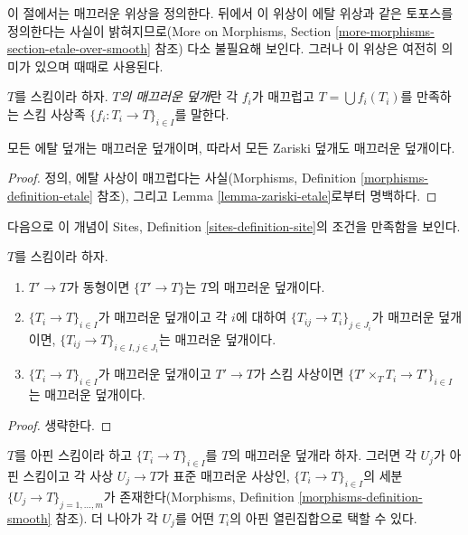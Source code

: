 \noindent
이 절에서는 매끄러운 위상을 정의한다. 뒤에서 이 위상이 에탈 위상과
같은 토포스를 정의한다는 사실이 밝혀지므로(More on Morphisms, Section
\ref{more-morphisms-section-etale-over-smooth} 참조) 다소 불필요해
보인다. 그러나 이 위상은 여전히 의미가 있으며 때때로 사용된다.

\begin{definition}
\label{definition-smooth-covering}
$T$를 스킴이라 하자. {\it $T$의 매끄러운 덮개}란 각 $f_i$가 매끄럽고
$T = \bigcup f_i(T_i)$를 만족하는 스킴 사상족
$\{f_i : T_i \to T\}_{i \in I}$를 말한다.
\end{definition}

\begin{lemma}
\label{lemma-zariski-etale-smooth}
모든 에탈 덮개는 매끄러운 덮개이며, 따라서 모든 Zariski 덮개도
매끄러운 덮개이다.
\end{lemma}

\begin{proof}
정의, 에탈 사상이 매끄럽다는 사실(Morphisms, Definition
\ref{morphisms-definition-etale} 참조), 그리고 Lemma
\ref{lemma-zariski-etale}로부터 명백하다.
\end{proof}

\noindent
다음으로 이 개념이 Sites, Definition \ref{sites-definition-site}의
조건을 만족함을 보인다.

\begin{lemma}
\label{lemma-smooth}
$T$를 스킴이라 하자.
\begin{enumerate}
\item $T' \to T$가 동형이면 $\{T' \to T\}$는 $T$의 매끄러운 덮개이다.
\item $\{T_i \to T\}_{i\in I}$가 매끄러운 덮개이고 각 $i$에 대하여
$\{T_{ij} \to T_i\}_{j\in J_i}$가 매끄러운 덮개이면,
$\{T_{ij} \to T\}_{i \in I, j\in J_i}$는 매끄러운 덮개이다.
\item $\{T_i \to T\}_{i\in I}$가 매끄러운 덮개이고 $T' \to T$가
스킴 사상이면 $\{T' \times_T T_i \to T'\}_{i\in I}$는 매끄러운
덮개이다.
\end{enumerate}
\end{lemma}

\begin{proof}
생략한다.
\end{proof}

\begin{lemma}
\label{lemma-smooth-affine}
$T$를 아핀 스킴이라 하고 $\{T_i \to T\}_{i \in I}$를 $T$의 매끄러운
덮개라 하자. 그러면 각 $U_j$가 아핀 스킴이고 각 사상 $U_j \to T$가
표준 매끄러운 사상인, $\{T_i \to T\}_{i \in I}$의 세분
$\{U_j \to T\}_{j = 1, \ldots, m}$가 존재한다(Morphisms, Definition
\ref{morphisms-definition-smooth} 참조). 더 나아가 각 $U_j$를 어떤
$T_i$의 아핀 열린집합으로 택할 수 있다.
\end{lemma}

